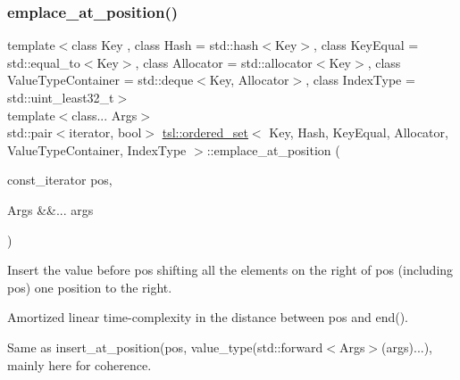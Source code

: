 \subsubsection{\texorpdfstring{emplace\_at\_position()}{emplace\_at\_position()}}
{\footnotesize\ttfamily template$<$class Key , class Hash  = std\+::hash$<$\+Key$>$, class Key\+Equal  = std\+::equal\+\_\+to$<$\+Key$>$, class Allocator  = std\+::allocator$<$\+Key$>$, class Value\+Type\+Container  = std\+::deque$<$\+Key, Allocator$>$, class Index\+Type  = std\+::uint\+\_\+least32\+\_\+t$>$ \\
template$<$class... Args$>$ \\
std\+::pair$<$iterator, bool$>$ \mbox{\hyperlink{classtsl_1_1ordered__set}{tsl\+::ordered\+\_\+set}}$<$ Key, Hash, Key\+Equal, Allocator, Value\+Type\+Container, Index\+Type $>$\+::emplace\+\_\+at\+\_\+position (\begin{DoxyParamCaption}\item[{const\+\_\+iterator}]{pos,  }\item[{Args \&\&...}]{args }\end{DoxyParamCaption})\hspace{0.3cm}{\ttfamily [inline]}}





Insert the value before pos shifting all the elements on the right of pos (including pos) one position to the right.

Amortized linear time-\/complexity in the distance between pos and end().

Same as insert\+\_\+at\+\_\+position(pos, value\+\_\+type(std\+::forward$<$\+Args$>$(args)...), mainly here for coherence. \mbox{\label{classtsl_1_1ordered__set_ad266d5e2425b6af842790944fa75ef76}} 
